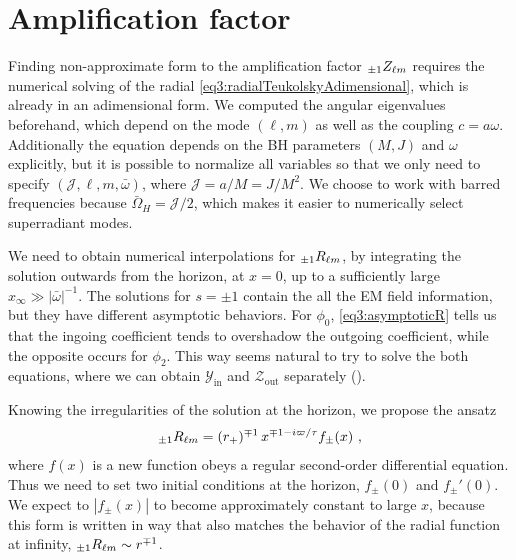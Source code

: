 
\section{Amplification factor}

Finding non-approximate form to the amplification factor $\uu[\pm 1]{Z}{\ell m}$ requires the numerical solving of the radial \eqref{eq3:radialTeukolskyAdimensional}, which is already in an adimensional form.
We computed the angular eigenvalues beforehand, which depend on the mode $(\ell,m)$ as well as the coupling $c=a\omega$.
Additionally the equation depends on the BH parameters $(M,J)$ and $\omega$ explicitly, but it is possible to normalize all variables so that we only need to specify $(\mathscr{J}, \ell, m, \bar{\omega})$, where $\mathscr{J}=a/M=J/M^2$.
We choose to work with barred frequencies because $\bar{\Omega}_H = \mathscr{J}/2$, which makes it easier to numerically select superradiant modes.

We need to obtain numerical interpolations for $\uu[\pm 1]{R}{\ell m}$, by integrating the solution outwards from the horizon, at $x=0$, up to a sufficiently large $x_\infty \gg |\bar{\omega}|^{-1}$. 
The solutions for $s=\pm 1$ contain the all the EM field information, but they have different asymptotic behaviors.
For $\phi_0$, \eqref{eq3:asymptoticR} tells us that the ingoing coefficient tends to overshadow the outgoing coefficient, while the opposite occurs for $\phi_2$.
This way seems natural to try to solve the both equations, where we can obtain $\mathscr{Y}_\mathrm{in}$ and $\mathscr{Z}_\mathrm{out}$ separately ().

Knowing the irregularities of the solution at the horizon, we propose the ansatz
\begin{align}
	\label{eq4:numericalRansatz}
	\uu[\pm 1]{R}{\ell m} = (r_+)^{\mp 1} \, x^{ \mp 1 - i \varpi / \tau} f_{\pm}(x) ~,
\end{align}
where $f(x)$ is a new function obeys a regular second-order differential equation.
Thus we need to set two initial conditions at the horizon, $f_{\pm}(0)$ and $f_{\pm}{\!}'(0)$.
We expect to $|f_\pm(x)|$ to become approximately constant to large $x$, because this
form is written in way that also matches the behavior of the radial function at infinity, $\uu[\pm 1]{R}{\ell m}\sim r^{\mp 1}$.

